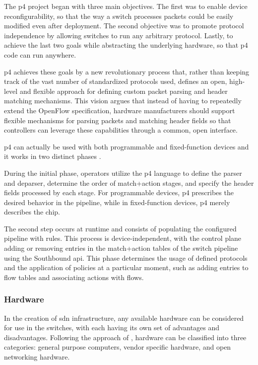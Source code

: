 The \gls{p4} project began with three main objectives\cite{bosshart_p4_2014}. The first was to enable device reconfigurability, so that the way a switch processes packets could be easily modified even after deployment. The second objective was to promote protocol independence by allowing switches to run any arbitrary protocol. Lastly, to achieve the last two goals while abstracting the underlying hardware, so that \gls{p4} code can run anywhere. 

\gls{p4} achieves these goals by a new revolutionary process that, rather than keeping track of the vast number of standardized protocols used, defines an open, high-level and flexible approach for defining custom packet parsing and header matching mechanisms. This vision argues that instead of having to repeatedly extend the OpenFlow specification, hardware manufacturers should support flexible mechanisms for parsing packets and matching header fields so that controllers can leverage these capabilities through a common, open interface. \cite{bosshart_p4_2014}

\gls{p4} can actually be used with both programmable and fixed-function devices\cite{peterson_software-defined_2021} and it works in two distinct phases \cite{bosshart_p4_2014}\cite{bifulco_survey_2018}. 

During the initial phase, operators utilize the \gls{p4} language to define the parser and deparser, determine the order of match+action stages, and specify the header fields processed by each stage. For programmable devices, \gls{p4} prescribes the desired behavior in the pipeline, while in fixed-function devices, \gls{p4} merely describes the chip. 

The second step occurs at runtime and consists of populating the configured pipeline with rules. This process is device-independent, with the control plane adding or removing entries in the match+action tables of the switch pipeline using the Southbound \gls{api}. This phase determines the usage of defined protocols and the application of policies at a particular moment, such as adding entries to flow tables and associating actions with flows.

\subsubsection{Hardware}
In the creation of \gls{sdn} infrastructure, any available hardware can be considered for use in the switches, with each having its own set of advantages and disadvantages. Following the approach of \cite{xia_survey_2015}, hardware can be classified into three categories: general purpose computers, vendor specific hardware, and open networking hardware. 


